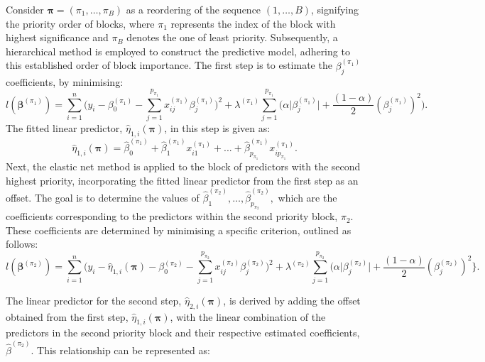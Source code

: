 Consider \(\bm{\pi} = (\pi_1, \ldots, \pi_B)\) as a reordering of the sequence \((1, \ldots, B)\), signifying the priority order of blocks, where \(\pi_1\) represents the index of the block with highest significance and \(\pi_B\) denotes the one of least priority. Subsequently, a hierarchical method is employed to construct the predictive model, adhering to this established order of block importance. The first step is to estimate the $\beta_j^{(\pi_1)}$ coefficients, by minimising:
 \begin{equation}
 \label{eq:elstic_block1}
 l(\bm{\beta}^{(\pi_1)}) = \sum\limits_{i=1}^{n}\bigg(y_i- \beta_0^{(\pi_1)}-\sum\limits_{j=1}^{p_{\pi_1}}x_{ij}^{(\pi_1)}\beta_j^{(\pi_1)}\bigg)^2 + \lambda^{(\pi_1)} \sum\limits_{j=1}^{p_{\pi_1}} \Big( \alpha \lvert \beta_j^{(\pi_1)} \rvert + \frac{(1 - \alpha)}{2}(\beta_j^{(\pi_1)})^2 \Big).  
\end{equation}
The fitted linear predictor, $\hat{\eta}_{1,i}(\bm{\pi})$, in this step is given as:
\begin{equation}
\hat{\eta}_{1,i}(\bm{\pi})= 
\hat{\beta}^{(\pi_1)}_0+
\hat{\beta}_1^{(\pi_1)}x_{i1}^{(\pi_1)} + . . . + \hat{\beta}_{p_{\pi_1}}^{(\pi_1)} 
x_{ip_{\pi_1}}^{(\pi_1)}.
\end{equation}
Next, the elastic net method is applied to the block of predictors with the second highest priority, incorporating the fitted linear predictor from the first step as an offset. The goal is to determine the values of $\hat{\beta}_{1}^{(\pi_2)}, \ldots, \hat{\beta}_{p_{\pi_2}}^{(\pi_2)},$ which are the coefficients corresponding to the predictors within the second priority block, $\pi_2$. These coefficients are determined by minimising a specific criterion, outlined as follows:
\begin{equation}
 l(\bm{\beta}^{(\pi_2)}) = \sum\limits_{i=1}^{n}\bigg(y_i- \hat{\eta}_{1,i}(\bm{\pi})-\beta_0^{(\pi_2)}-\sum\limits_{j=1}^{p_{\pi_2}}x_{ij}^{(\pi_2)}\beta_j^{(\pi_2)}\bigg)^2 + \lambda^{(\pi_2)} \sum\limits_{j=1}^{p_{\pi_2}} \Big( \alpha \lvert \beta_j^{(\pi_2)} \rvert + \frac{(1 - \alpha)}{2}(\beta_j^{(\pi_2)})^2 \Bigg\}. 
\end{equation}

The linear predictor for the second step,
\(\hat{\eta}_{2,i}(\bm{\pi})\), is derived by adding the offset obtained from the first step, 
\(\hat{\eta}_{1,i}(\bm{\pi})\), with the linear combination of the predictors in the second priority block and their respective estimated coefficients,
\(\hat{\beta}^{(\pi_2)}\). This relationship can be represented as:

